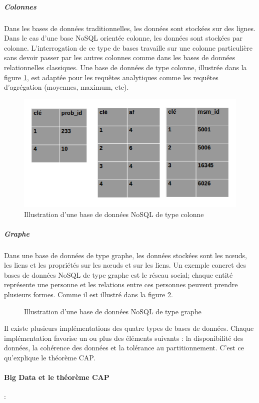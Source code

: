 		\subparagraph{Colonnes} Dans les bases de données traditionnelles, les données sont stockées sur des lignes. Dans le cas d'une base NoSQL orientée colonne, les données sont stockées par colonne. L'interrogation de ce type de bases travaille sur une colonne particulière sans devoir passer par les autres colonnes comme dans les bases de données relationnelles classiques. Une base de données de type colonne, illustrée dans la figure  	\ref{fig:comomn-nosql}, est adaptée pour les requêtes analytiques comme les requêtes d'agrégation (moyennes, maximum, etc).

	
	\begin{figure}[H]
		\centering
		\includegraphics[width=0.7\linewidth]{illustrations/colomn-nosql.png}
		\caption{Illustration d'une base de données NoSQL de type colonne}
		\label{fig:comomn-nosql}
	\end{figure}
	

	\subparagraph{Graphe} Dans une base de données de type graphe, les données stockées sont les n\oe{}uds, les liens et les propriétés sur les n\oe{}uds et sur les liens. Un exemple concret des bases de données NoSQL de type graphe est le réseau social; chaque entité représente une personne et les relations entre ces personnes peuvent prendre plusieurs formes. Comme il est illustré dans la figure  	\ref{fig:graphe-nosql}.

	
	\begin{figure}[H]
		\centering
		\resizebox{\textwidth}{!}{
		
	    }
		\caption{Illustration d'une base de données NoSQL de type graphe}
		\label{fig:graphe-nosql}
	\end{figure}
	
	Il existe plusieurs implémentations des quatre types de bases de données. Chaque implémentation favorise un ou plus des éléments suivants : la disponibilité des données, la cohérence des données et la tolérance au partitionnement.  C'est ce qu'explique le théorème CAP.	
		
		\paragraph{Big Data et le théorème  CAP} \label{par:cap-theorem}:
		
